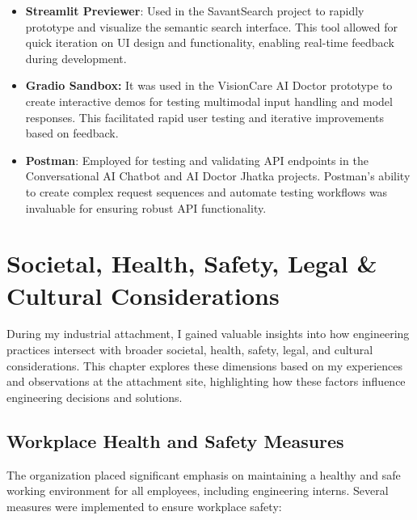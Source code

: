\documentclass[12pt,a4paper]{article}
\begin{document}
\begin{itemize}
    \item \textbf{Streamlit Previewer}: Used in the SavantSearch project to rapidly prototype and visualize the semantic search interface. This tool allowed for quick iteration on UI design and functionality, enabling real-time feedback during development.
    
    \item \textbf{Gradio Sandbox:} It was used in the VisionCare AI Doctor prototype to create interactive demos for testing multimodal input handling and model responses. This facilitated rapid user testing and iterative improvements based on feedback.
    \item \textbf{Postman}: Employed for testing and validating API endpoints in the Conversational AI Chatbot and AI Doctor Jhatka projects. Postman's ability to create complex request sequences and automate testing workflows was invaluable for ensuring robust API functionality.
    
\end{itemize}

\newpage
\section{Societal, Health, Safety, Legal \& Cultural Considerations}

During my industrial attachment, I gained valuable insights into how engineering practices intersect with broader societal, health, safety, legal, and cultural considerations. This chapter explores these dimensions based on my experiences and observations at the attachment site, highlighting how these factors influence engineering decisions and solutions.

\subsection{Workplace Health and Safety Measures}

The organization placed significant emphasis on maintaining a healthy and safe working environment for all employees, including engineering interns. Several measures were implemented to ensure workplace safety:
\end{document}
